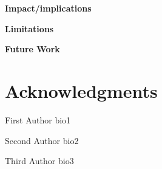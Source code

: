 \documentclass[10pt,journal,compsoc]{joser1}
\begin{document}
\noindent\textbf{Impact/implications}

\noindent\textbf{Limitations}

\noindent\textbf{Future Work}

\section*{Acknowledgments}





\begin{IEEEbiography}[{author}]{First Author}
bio1
\end{IEEEbiography}

\begin{IEEEbiography}[{author}]{Second Author}
bio2
\end{IEEEbiography}


\begin{IEEEbiography}[{author}]{Third Author}
bio3
\end{IEEEbiography}



\vfill


\end{document}
